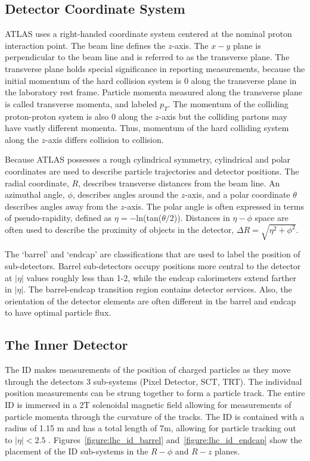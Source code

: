\subsection{Detector Coordinate System}

ATLAS uses a right-handed  coordinate system centered at the nominal proton interaction point. The beam line defines the $z$-axis. The $x-y$ plane is perpendicular to the beam line and is referred to as the transverse plane. The transverse plane holds special significance in reporting measurements, because the initial momentum of the hard collision system is 0 along the transverse plane in the laboratory rest frame. Particle momenta measured along the transverse plane is called transverse momenta, and labeled $p_T$.  The momentum of the colliding proton-proton system is also 0 along the $z$-axis but the colliding partons may have vastly different momenta. Thus, momentum of the hard colliding system along the $z$-axis differs collision to collision. 

Because ATLAS possesses a rough cylindrical symmetry, cylindrical and polar coordinates are used to describe particle trajectories and detector positions. The radial coordinate, $R$, describes transverse distances from the beam line. An azimuthal angle, $\phi$, describes angles around the $z$-axis, and a polar coordinate $\theta$ describes angles away from the $z$-axis. The polar angle is often expressed in terms of pseudo-rapidity, defined as $\eta=-$ln(tan($\theta/2$)). Distances in $\eta-\phi$ space are often used to describe the proximity of objects in the detector, $\Delta R = \sqrt{\eta^2 + \phi^2}$.

The `barrel' and `endcap' are classifications that are used to label the position of sub-detectors. Barrel sub-detectors occupy positions more central to the detector at $|\eta|$ values roughly less than 1-2, while the endcap calorimeters extend farther in $|\eta|$. The barrel-endcap transition region contains detector services. Also, the orientation of the detector elements are often different in the barrel and endcap to have optimal particle flux.  

\subsection{The Inner Detector}

The ID makes measurements of the position of charged particles as they move through the detectors 3 sub-systems (Pixel Detector, SCT, TRT). The individual position measurements can be strung together to form a particle track. The entire ID is immersed in a 2T solenoidal magnetic field allowing for measurements of particle momenta through the curvature of the tracks. The ID is contained with a radius of 1.15 m and has a total length of 7m, allowing for particle tracking out to $|\eta| < 2.5$ . Figures~\ref{figure:lhc_id_barrel} and~\ref{figure:lhc_id_endcap} show the placement of the ID sub-systems in the $R-\phi$ and $R-z$ planes.  



